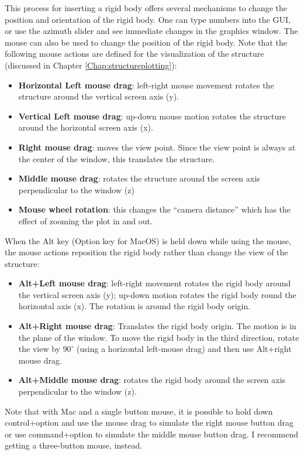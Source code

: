 This process for inserting a rigid body offers several mechanisms to change the position and orientation of the rigid body. One can type numbers into the GUI, or use the azimuth slider and see immediate changes in the graphics window. The mouse can also be used to change the position of the rigid body. Note that the following  mouse actions are defined for the visualization of the structure (discussed in Chapter  \ref{Chap:structureplotting}): 
\begin{itemize}
    \item \textbf{Horizontal Left mouse drag}: left-right mouse movement rotates the structure around the vertical screen axis (y). 
    \item \textbf{Vertical Left mouse drag}: up-down mouse motion rotates the structure around the horizontal screen axis (x). 
    \item \textbf{Right mouse drag}: moves the view point. Since the view point is always at the center of the window, this translates the structure.
    \item     \textbf{Middle mouse drag}: rotates the structure around the screen axis perpendicular to the window (z)
    \item \textbf{Mouse wheel rotation}: this changes the ``camera distance'' which has the effect of zooming the plot in and out.
\end{itemize}
When the Alt key (Option key for MacOS) is held down while using the mouse, the mouse actions reposition the rigid body rather than change the view of the structure:
\begin{itemize}
    \item \textbf{Alt+Left mouse drag}: left-right movement rotates the rigid body around the vertical screen axis (y); up-down motion rotates the rigid body round the horizontal axis (x). The rotation is around the rigid body origin.
    \item \textbf{Alt+Right mouse drag}: Translates the rigid body origin. The motion is in the plane of the window. To move the rigid body in the third direction, rotate the view by $90^\circ$ (using a horizontal left-mouse drag) and then use Alt+right mouse drag. 
    \item     \textbf{Alt+Middle mouse drag}: rotates the rigid body around the screen axis perpendicular to the window (z).
\end{itemize}
Note that with Mac and a single button mouse, it is possible to hold down control+option and use the mouse drag to simulate the right mouse button drag or use command+option to simulate the middle mouse button drag. I recommend getting a three-button mouse, instead. 

